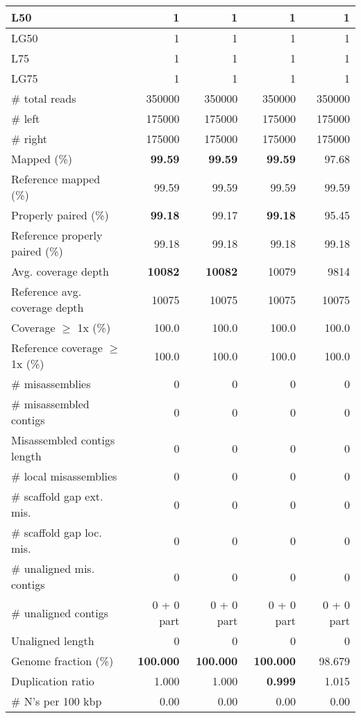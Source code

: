 \documentclass[12pt,a4paper]{article}
\begin{document}
\begin{table}[ht]
\begin{center}
\begin{tabular}{|l*{4}{|r}|}
L50 & 1 & 1 & 1 & 1 \\ \hline
LG50 & 1 & 1 & 1 & 1 \\ \hline
L75 & 1 & 1 & 1 & 1 \\ \hline
LG75 & 1 & 1 & 1 & 1 \\ \hline
\# total reads & 350000 & 350000 & 350000 & 350000 \\ \hline
\# left & 175000 & 175000 & 175000 & 175000 \\ \hline
\# right & 175000 & 175000 & 175000 & 175000 \\ \hline
Mapped (\%) & {\bf 99.59} & {\bf 99.59} & {\bf 99.59} & 97.68 \\ \hline
Reference mapped (\%) & 99.59 & 99.59 & 99.59 & 99.59 \\ \hline
Properly paired (\%) & {\bf 99.18} & 99.17 & {\bf 99.18} & 95.45 \\ \hline
Reference properly paired (\%) & 99.18 & 99.18 & 99.18 & 99.18 \\ \hline
Avg. coverage depth & {\bf 10082} & {\bf 10082} & 10079 & 9814 \\ \hline
Reference avg. coverage depth & 10075 & 10075 & 10075 & 10075 \\ \hline
Coverage $\geq$ 1x (\%) & 100.0 & 100.0 & 100.0 & 100.0 \\ \hline
Reference coverage $\geq$ 1x (\%) & 100.0 & 100.0 & 100.0 & 100.0 \\ \hline
\# misassemblies & 0 & 0 & 0 & 0 \\ \hline
\# misassembled contigs & 0 & 0 & 0 & 0 \\ \hline
Misassembled contigs length & 0 & 0 & 0 & 0 \\ \hline
\# local misassemblies & 0 & 0 & 0 & 0 \\ \hline
\# scaffold gap ext. mis. & 0 & 0 & 0 & 0 \\ \hline
\# scaffold gap loc. mis. & 0 & 0 & 0 & 0 \\ \hline
\# unaligned mis. contigs & 0 & 0 & 0 & 0 \\ \hline
\# unaligned contigs & 0 + 0 part & 0 + 0 part & 0 + 0 part & 0 + 0 part \\ \hline
Unaligned length & 0 & 0 & 0 & 0 \\ \hline
Genome fraction (\%) & {\bf 100.000} & {\bf 100.000} & {\bf 100.000} & 98.679 \\ \hline
Duplication ratio & 1.000 & 1.000 & {\bf 0.999} & 1.015 \\ \hline
\# N's per 100 kbp & 0.00 & 0.00 & 0.00 & 0.00 \\ \hline

\end{tabular}
\end{center}
\end{table}
\end{document}
